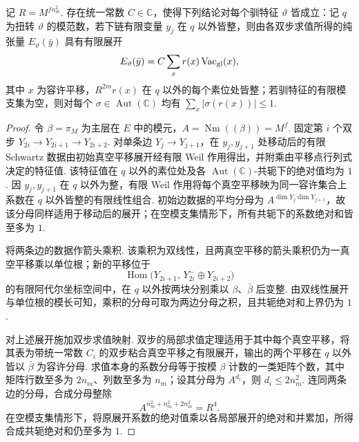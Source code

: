 \begin{lemma}[有限求值张量的真空展开]
\label{lem:a-seesaw-vacuum-expansion}
\emitthmsource
记 $R=M^{f n_m^2}$. 存在统一常数 $C\in\mathbb C$，使得下列结论对每个驯特征 $\vartheta$ 皆成立：记 $q$ 为扭转 $\vartheta$ 的模范数，若下链有限变量 $y_j$ 在 $q$ 以外皆整，则由各双步求值所得的纯张量 $E_\vartheta(\bar y)$ 具有有限展开
\[
 E_\vartheta(\bar y)
  =C\sum_x r(x)\operatorname{Vac}_{\rm gl}(x),
\]
其中 $x$ 为容许平移，$R^{2m}r(x)$ 在 $q$ 以外的每个素位处皆整；若驯特征的有限模支集为空，则对每个 $\sigma\in\operatorname{Aut}(\mathbb C)$ 均有 $\sum_x|\sigma(r(x))|\le1$.
\end{lemma}
\begin{proof}
令 $\beta=\pi_M$ 为主层在 $E$ 中的模元，$A=\operatorname{Nm}((\beta))=M^f$. 固定第 $i$ 个双步 $Y_{2i}\to Y_{2i+1}\to Y_{2i+2}$. 对单条边 $Y_j\to Y_{j+1}$，在 $y_j,y_{j+1}$ 处移动后的有限 Schwartz 数据由初始真空平移展开经有限 Weil 作用得出，并附乘由平移点行列式决定的特征值. 该特征值在 $q$ 以外的素位处及各 $\operatorname{Aut}(\mathbb C)$-共轭下的绝对值均为 $1$. 因 $y_j,y_{j+1}$ 在 $q$ 以外为整，有限 Weil 作用将每个真空平移映为同一容许集合上系数在 $q$ 以外皆整的有限线性组合. 初始边数据的平均分母为 $A^{\dim Y_j\dim Y_{j+1}}$，故该分母同样适用于移动后的展开；在空模支集情形下，所有共轭下的系数绝对和皆至多为 $1$.

将两条边的数据作箭头乘积. 该乘积为双线性，且两真空平移的箭头乘积仍为一真空平移乘以单位根；新的平移位于
\[
 \operatorname{Hom}\bigl(Y_{2i+1},\,Y_{2i}^{-}\oplus Y_{2i+2}\bigr)
\]
的有限阿代尔坐标空间中，在 $q$ 以外按两块分别乘以 $\beta$、$\bar\beta$ 后变整. 由双线性展开与单位根的模长可知，乘积的分母可取为两边分母之积，且共轭绝对和上界仍为 $1$.

对上述展开施加双步求值映射. 双步的局部求值定理适用于其中每个真空平移，将其表为带统一常数 $C_i$ 的双步粘合真空平移之有限展开，输出的两个平移在 $q$ 以外皆以 $\bar\beta$ 为容许分母. 求值本身的系数分母等于按模 $\beta$ 计数的一类矩阵个数，其中矩阵行数至多为 $2n_m$、列数至多为 $n_m$；设其分母为 $A^{d_i}$，则 $d_i\le2n_m^2$. 连同两条边的分母，合成分母整除
\[
 A^{n_m^2+n_m^2+2n_m^2}=R^4 .
\]
在空模支集情形下，将原展开系数的绝对值乘以各局部展开的绝对和并累加，所得合成共轭绝对和仍至多为 $1$.


\end{proof}
